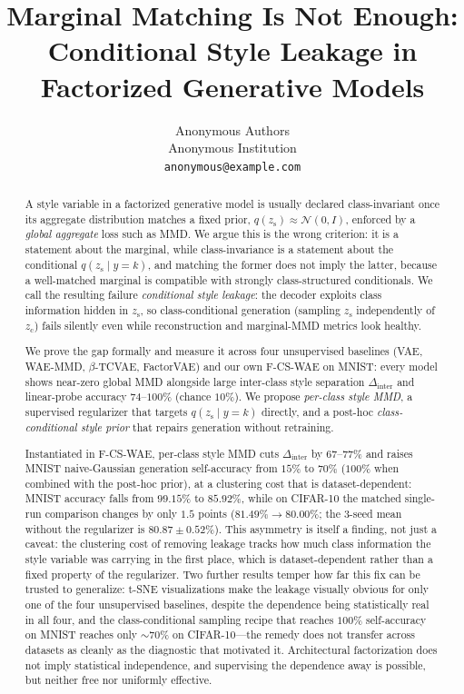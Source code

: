 \documentclass[10pt,letterpaper]{article}
\title{\vspace{-1.0em}
Marginal Matching Is Not Enough: \\
Conditional Style Leakage in Factorized Generative Models
\vspace{-0.3em}}
\author{
Anonymous Authors\\
\small Anonymous Institution\\
\small \texttt{anonymous@example.com}
}
\date{}
\newcommand{\ours}{F-CS-WAE}
\newcommand{\zc}{z_{\mathrm{c}}}
\newcommand{\zs}{z_{\mathrm{s}}}
\begin{document}
\maketitle

\begin{abstract}
A style variable in a factorized generative model is usually declared
class-invariant once its aggregate distribution matches a fixed prior,
$q(\zs)\approx\mathcal{N}(0,I)$, enforced by a \emph{global aggregate} loss
such as MMD. We argue this is the wrong criterion: it is a statement about
the marginal, while class-invariance is a statement about the conditional
$q(\zs\mid y{=}k)$, and matching the former does not imply the latter,
because a well-matched marginal is compatible with strongly class-structured
conditionals. We call the resulting failure \emph{conditional style leakage}:
the decoder exploits class information hidden in $\zs$, so class-conditional
generation (sampling $\zs$ independently of $\zc$) fails silently even while
reconstruction and marginal-MMD metrics look healthy.

We prove the gap formally and measure it across four unsupervised baselines
(VAE, WAE-MMD, $\beta$-TCVAE, FactorVAE) and our own \ours{} on MNIST: every
model shows near-zero global MMD alongside large inter-class style separation
$\Delta_{\mathrm{inter}}$ and linear-probe accuracy $74$--$100\%$ (chance
$10\%$). We propose \emph{per-class style MMD}, a supervised regularizer that
targets $q(\zs\mid y{=}k)$ directly, and a post-hoc \emph{class-conditional
style prior} that repairs generation without retraining.

Instantiated in \ours{}, per-class style MMD cuts $\Delta_{\mathrm{inter}}$ by
$67$--$77\%$ and raises MNIST naive-Gaussian generation self-accuracy from
$15\%$ to $70\%$ ($100\%$ when combined with the post-hoc prior), at a
clustering cost that is dataset-dependent: MNIST accuracy falls from
$99.15\%$ to $85.92\%$, while on CIFAR-10 the matched single-run comparison
changes by only $1.5$ points ($81.49\%\to80.00\%$; the 3-seed mean without
the regularizer is $80.87\pm0.52\%$). This asymmetry is itself a finding,
not just a caveat: the clustering cost of removing leakage tracks how much
class information the style variable was carrying in the first place, which
is dataset-dependent rather than a fixed property of the regularizer. Two
further results temper how far this fix can be trusted to generalize:
t-SNE visualizations make the leakage visually obvious for only one of the
four unsupervised baselines, despite the dependence being statistically real
in all four, and the class-conditional sampling recipe that reaches $100\%$
self-accuracy on MNIST reaches only $\sim\!70\%$ on CIFAR-10---the remedy
does not transfer across datasets as cleanly as the diagnostic that
motivated it. Architectural factorization does not imply statistical
independence, and supervising the dependence away is possible, but neither
free nor uniformly effective.
\end{abstract}
\end{document}
